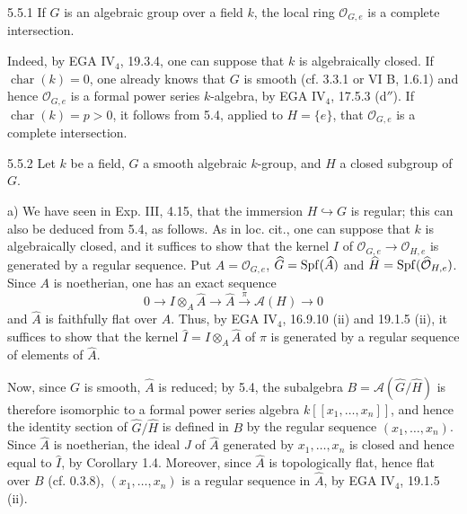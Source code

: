 \begin{corollary}{5.5.1}\label{VIIB.5.5.1}
If $G$ is an algebraic group over a field $k$, the local ring $\mathcal O_{G,e}$ is a complete intersection.
\end{corollary}
Indeed, by EGA IV$_4$, 19.3.4, one can suppose that $k$ is algebraically closed. If $\operatorname{char}(k)=0$, one already knows that $G$ is smooth (cf. 3.3.1 or VI B, 1.6.1) and hence $\mathcal O_{G,e}$ is a formal power series $k$-algebra, by EGA IV$_4$, 17.5.3 (d$''$). If $\operatorname{char}(k)=p>0$, it follows from 5.4, applied to $H=\{e\}$, that $\mathcal O_{G,e}$ is a complete intersection.

\begin{remarks}{5.5.2}\label{VIIB.5.5.2}
Let $k$ be a field, $G$ a smooth algebraic $k$-group, and $H$ a closed subgroup of $G$.

a) We have seen in Exp. III, 4.15, that the immersion $H\hookrightarrow G$ is regular; this can also be deduced from 5.4, as follows. As in loc. cit., one can suppose that $k$ is algebraically closed, and it suffices to show that the kernel $I$ of $\mathcal O_{G,e}\to\mathcal O_{H,e}$ is generated by a regular sequence. Put $A=\mathcal O_{G,e}$, $\widehat G=\operatorname{Spf}(\widehat A)$ and $\widehat H=\operatorname{Spf}(\widehat{\mathcal O}_{H,e})$. Since $A$ is noetherian, one has an exact sequence
\[
0\longrightarrow I\otimes_A\widehat A\longrightarrow\widehat A\xrightarrow\pi\mathscr A(H)\longrightarrow0
\]
and $\widehat A$ is faithfully flat over $A$. Thus, by EGA IV$_4$, 16.9.10 (ii) and 19.1.5 (ii), it suffices to show that the kernel $\widehat I=I\otimes_A\widehat A$ of $\pi$ is generated by a regular sequence of elements of $\widehat A$.

Now, since $G$ is smooth, $\widehat A$ is reduced; by 5.4, the subalgebra $B=\mathscr A(\widehat G/\widehat H)$ is therefore isomorphic to a formal power series algebra $k[[x_1,\ldots,x_n]]$, and hence the identity section of $\widehat G/\widehat H$ is defined in $B$ by the regular sequence $(x_1,\ldots,x_n)$. Since $\widehat A$ is noetherian, the ideal $J$ of $\widehat A$ generated by $x_1,\ldots,x_n$ is closed and hence equal to $\widehat I$, by Corollary 1.4. Moreover, since $\widehat A$ is topologically flat, hence flat over $B$ (cf. 0.3.8), $(x_1,\ldots,x_n)$ is a regular sequence in $\widehat A$, by EGA IV$_4$, 19.1.5 (ii).


\end{remarks}
